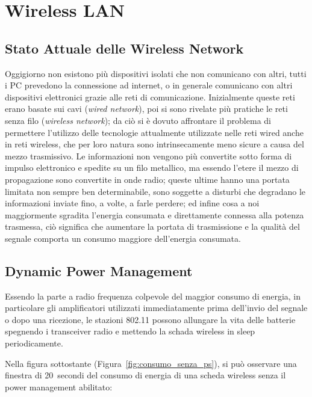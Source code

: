 \chapter{Wireless LAN}\label{cap:wlan}

\section{Stato Attuale delle Wireless Network}\label{sec:stato_attuale}

Oggigiorno non esistono pi\`u dispositivi isolati che non comunicano con altri, tutti i PC prevedono la
connessione ad internet, o in generale comunicano con altri dispositivi elettronici grazie alle reti di
comunicazione. Inizialmente queste reti erano basate sui cavi ({\em wired network}), poi si sono rivelate
pi\`u pratiche le reti senza filo ({\em wireless network}); da ci\`o si \`e dovuto affrontare il problema di
permettere l'utilizzo delle tecnologie attualmente utilizzate nelle reti wired anche in reti wireless, che
per loro natura sono intrinsecamente meno sicure a causa del mezzo trasmissivo. Le informazioni non vengono
pi\`u convertite sotto forma di impulso elettronico e spedite su un filo metallico, ma essendo l'etere il
mezzo di propagazione sono convertite in onde radio; queste ultime hanno una portata limitata non sempre ben
determinabile, sono soggette a disturbi che degradano le informazioni inviate fino, a volte, a farle
perdere; ed infine cosa a noi maggiormente sgradita l'energia consumata e direttamente connessa alla potenza
trasmessa, ci\`o significa che aumentare la portata di trasmissione e la qualit\`a del segnale comporta un
consumo maggiore dell'energia consumata.

\section{Dynamic Power Management}\label{sec:dpm}

Essendo la parte a radio frequenza colpevole del maggior consumo di energia, in particolare gli
amplificatori utilizzati immediatamente prima dell'invio del segnale o dopo una ricezione, le stazioni
802.11 possono allungare la vita delle batterie spegnendo i transceiver radio e mettendo la schada wireless
in sleep periodicamente.

Nella figura sottostante (Figura~\ref{fig:consumo_senza_ps}), si pu\`o osservare una finestra di 20~secondi
del consumo di energia di una scheda wireless senza il power management abilitato:

